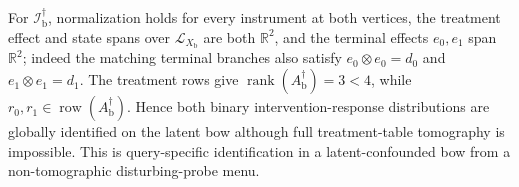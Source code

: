 For \(\mathcal I_{\mathrm b}^{\dagger}\), normalization holds for every instrument at both vertices, the treatment effect and state spans over \(\mathcal L_{X_{\mathrm b}}\) are both \(\mathbb R^2\), and the terminal effects \(e_0,e_1\) span \(\mathbb R^2\); indeed the matching terminal branches also satisfy \(e_0\otimes e_0=d_0\) and \(e_1\otimes e_1=d_1\). The treatment rows give \(\operatorname{rank}(A_{\mathrm b}^{\dagger})=3<4\), while \(r_0,r_1\in\operatorname{row}(A_{\mathrm b}^{\dagger})\). Hence both binary intervention-response distributions are globally identified on the latent bow although full treatment-table tomography is impossible. This is query-specific identification in a latent-confounded bow from a non-tomographic disturbing-probe menu.